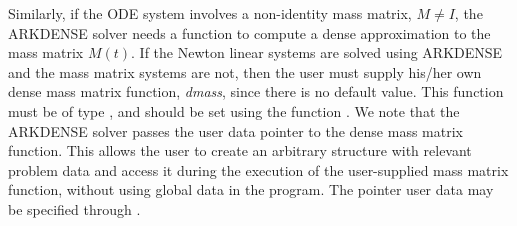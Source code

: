 \documentclass[letterpaper,10pt,english]{sphinxmanual}
\begin{document}
Similarly, if the ODE system involves a non-identity mass matrix,
$M\ne I$, the ARKDENSE solver needs a function to compute a
dense approximation to the mass matrix $M(t)$. If the Newton
linear systems are solved using ARKDENSE and the mass matrix systems
are not, then the user must supply his/her own dense mass matrix
function, \emph{dmass}, since there is no default value.  This function
must be of type {\hyperref[c_interface/User_supplied:ARKDlsDenseMassFn]{}}, and should be set using
the function {\hyperref[c_interface/User_callable:ARKDlsSetDenseMassFn]{}}.  We note that the
ARKDENSE solver passes the user data pointer to the dense mass matrix
function. This allows the user to create an arbitrary structure with
relevant problem data and access it during the execution of the
user-supplied mass matrix function, without using global data in the
program. The pointer user data may be specified through
{\hyperref[c_interface/User_callable:ARKodeSetUserData]{}}.
\end{document}
